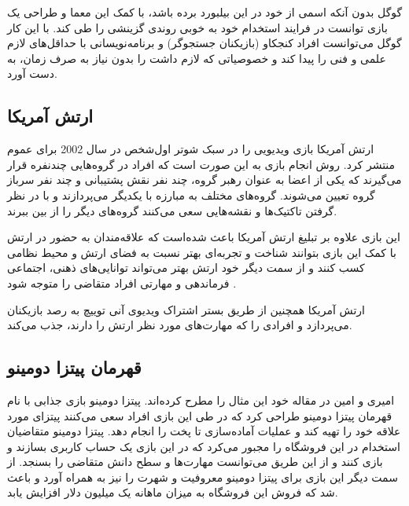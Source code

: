 گوگل بدون آنکه اسمی از خود در این بیلبورد برده باشد، با کمک این معما و طراحی یک بازی توانست در فرایند استخدام خود به خوبی روندی گزینشی را طی کند. با این کار گوگل می‌توانست افراد کنجکاو (بازیکنان جستجوگر) و برنامه‌نویسانی با حداقل‌های لازم علمی و فنی را پیدا کند و خصوصیاتی که لازم داشت را بدون نیاز به صرف زمان، به دست آورد.

\subsection{ارتش آمریکا}
ارتش آمریکا بازی ویدیویی \href{https://www.americasarmy.com/}{} را  در سبک شوتر اول‌شخص در سال 2002 برای عموم منتشر کرد. روش انجام بازی به این صورت است که افراد در گروه‌هایی چندنفره قرار می‌گیرند که یکی از اعضا به عنوان رهبر گروه، چند نفر نقش پشتیبانی و چند نفر سرباز گروه تعیین می‌شوند. گروه‌های مختلف به مبارزه با یکدیگر می‌پردازند و با در نظر گرفتن تاکتیک‌ها و نقشه‌هایی سعی می‌کنند گروه‌های دیگر را از بین ببرند.

این بازی علاوه بر تبلیغ ارتش آمریکا باعث شده‌است که علاقه‌مندان به حضور در ارتش با کمک این بازی بتوانند شناخت و تجربه‌ای بهتر نسبت به فضای ارتش و محیط نظامی کسب کنند و از سمت دیگر خود ارتش بهتر می‌تواند توانایی‌های ذهنی، اجتماعی فرماندهی و مهارتی افراد متقاضی را متوجه شود \cite{mrg}.

ارتش آمریکا همچنین از طریق بستر اشتراک ویدیوی آنی توییچ به رصد بازیکنان می‌پردازد و افرادی را که مهارت‌های مورد نظر ارتش را دارند، جذب می‌کند.

\subsection{قهرمان پیتزا دومینو}
امیری و امین \cite{amiriamin} در مقاله خود این مثال را مطرح کرده‌اند. پیتزا دومینو بازی جذابی با نام قهرمان پیتزا دومینو طراحی کرد که در طی این بازی افراد سعی می‌کنند پیتزای مورد علاقه خود را تهیه کند و عملیات آماده‌سازی تا پخت را انجام دهد. پیتزا دومینو متقاضیان استخدام در این فروشگاه را مجبور می‌کرد که در این بازی یک حساب کاربری بسازند و بازی کنند و از این طریق می‌توانست مهارت‌ها و سطح دانش متقاضی را بسنجد. از سمت دیگر این بازی برای پیتزا دومینو معروفیت و شهرت را نیز به همراه آورد و باعث شد که فروش این فروشگاه به میزان ماهانه یک میلیون دلار افزایش یابد.

